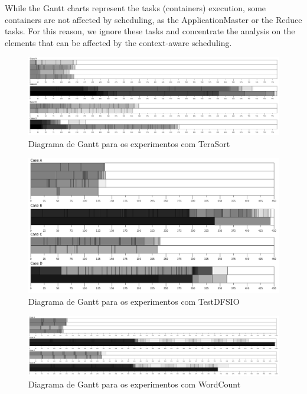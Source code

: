 While the Gantt charts represent the tasks (containers) execution, some containers are not affected by scheduling, as the ApplicationMaster or the Reduce tasks. For this reason, we ignore these tasks and concentrate the analysis on the elements that can be affected by the context-aware scheduling.

\begin{figure}[!ht]
	\centering
	\includegraphics[width=1\textwidth]{figuras/todos.png}
	\caption{Diagrama de Gantt para os experimentos com TeraSort}
	\label{fig:exp1TS}
\end{figure}

\begin{figure}[!ht]
	\centering
	\includegraphics[width=1\textwidth]{figuras/todos-DFSIO.png}
	\caption{Diagrama de Gantt para os experimentos com TestDFSIO}
	\label{fig:exp1IO}
\end{figure}

\begin{figure}[!ht]
	\centering
	\includegraphics[width=1\textwidth]{figuras/todos-WC.png}
	\caption{Diagrama de Gantt para os experimentos com WordCount}
	\label{fig:exp1WC}
\end{figure}

